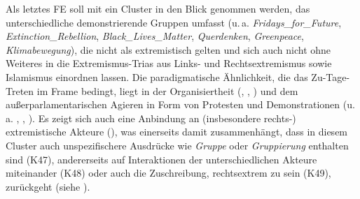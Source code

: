 Als letztes FE soll mit  ein Cluster in den Blick genommen werden, das unterschiedliche demonstrierende Gruppen umfasst (u.\,a. \emph{Fridays\_for\_Future}, \emph{Extinction\_Rebellion}, \emph{Black\_Lives\_Matter}, \emph{Querdenken}, \emph{Greenpeace}, \emph{Klimabewegung}), die nicht als extremistisch gelten und sich auch nicht ohne Weiteres in die Extremismus-Trias aus Links- und Rechtsextremismus sowie Islamismus einordnen lassen. Die paradigmatische Ähnlichkeit, die das Zu-Tage-Treten im Frame bedingt, liegt in der Organisiertheit (, , ) und dem außerparlamentarischen Agieren in Form von Protesten und Demonstrationen (u.\,a. , , ). Es zeigt sich auch eine Anbindung an (insbesondere rechts\mbox{-}) extremistische Akteure (), was einerseits damit zusammenhängt, dass in diesem Cluster auch unspezifischere Ausdrücke wie \emph{Gruppe} oder \emph{Gruppierung} enthalten sind (K47), andererseits auf Interaktionen der unterschiedlichen Akteure miteinander (K48) oder auch die Zuschreibung, rechtsextrem zu sein (K49), zurückgeht (siehe ).

